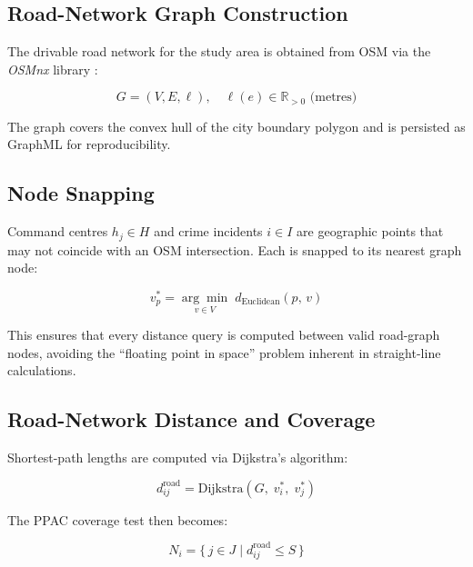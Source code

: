 \documentclass[12pt]{article}
\begin{document}
\subsection{Road-Network Graph Construction}

The drivable road network for the study area is obtained from OSM via the
\textit{OSMnx} library \cite{boeing2017}:

\begin{equation}
    G = (V, E, \ell), \quad \ell(e) \in \mathbb{R}_{>0} \text{ (metres)}
\end{equation}

The graph covers the convex hull of the city boundary polygon and is persisted
as GraphML for reproducibility.

\subsection{Node Snapping}

Command centres $h_j \in H$ and crime incidents $i \in I$ are geographic
points that may not coincide with an OSM intersection.  Each is snapped to its
nearest graph node:

\begin{equation}
    v^*_p = \underset{v \in V}{\arg\min}\; d_{\mathrm{Euclidean}}(p,\, v)
\end{equation}

This ensures that every distance query is computed between valid road-graph
nodes, avoiding the ``floating point in space'' problem inherent in
straight-line calculations.

\subsection{Road-Network Distance and Coverage}

Shortest-path lengths are computed via Dijkstra's algorithm:

\begin{equation}
    d^{\mathrm{road}}_{ij} =
    \text{Dijkstra}\!\left(G,\; v^*_i,\; v^*_j\right)
    \label{eq:dijkstra}
\end{equation}

The PPAC coverage test then becomes:

\begin{equation}
    N_i = \bigl\{\, j \in J \;\big|\; d^{\mathrm{road}}_{ij} \le S \,\bigr\}
    \label{eq:Ni_road}
\end{equation}
\end{document}
